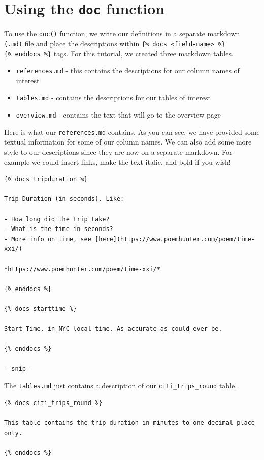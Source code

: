 \documentclass[
]{book}
\begin{document}
\hypertarget{using-the-doc-function}{%
\section{\texorpdfstring{Using the \texttt{doc} function}{Using the doc function}}\label{using-the-doc-function}}

To use the \texttt{doc()} function, we write our definitions in a separate markdown \texttt{(.md)} file and place the descriptions within \texttt{\{\%\ docs\ \textless{}field-name\textgreater{}\ \%\}} \texttt{\{\%\ enddocs\ \%\}} tags. For this tutorial, we created three markdown tables.

\begin{itemize}
\item
  \texttt{references.md} - this contains the descriptions for our column names of interest
\item
  \texttt{tables.md} - contains the descriptions for our tables of interest
\item
  \texttt{overview.md} - contains the text that will go to the overview page
\end{itemize}

Here is what our \texttt{references.md} contains. As you can see, we have provided some textual information for some of our column names. We can also add some more style to our descriptions since they are now on a separate markdown. For example we could insert links, make the text italic, and bold if you wish!

\begin{verbatim}
{% docs tripduration %}

Trip Duration (in seconds). Like:

- How long did the trip take?
- What is the time in seconds?
- More info on time, see [here](https://www.poemhunter.com/poem/time-xxi/)

*https://www.poemhunter.com/poem/time-xxi/*

{% enddocs %}

{% docs starttime %}

Start Time, in NYC local time. As accurate as could ever be.

{% enddocs %}

--snip--
\end{verbatim}

The \texttt{tables.md} just contains a description of our \texttt{citi\_trips\_round} table.

\begin{verbatim}
{% docs citi_trips_round %}

This table contains the trip duration in minutes to one decimal place only. 

{% enddocs %}
\end{verbatim}
\end{document}
